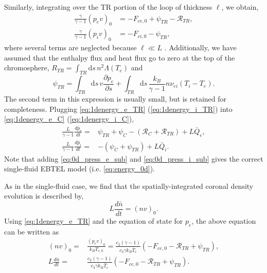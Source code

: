 Similarly, integrating over the TR portion of the loop of thickness $\ell$, we obtain,
\begin{align}
    \frac{\gamma}{\gamma - 1}(p_ev)_0 &= - F_{ce,0} + \psi_{TR} - \mathcal{R}_{TR}, \label{eq:1denergy_e_TR} \\[0.5em]
    \frac{\gamma}{\gamma - 1}(p_iv)_0 &=  - F_{ci,0} - \psi_{TR}, \label{eq:1denergy_i_TR}
\end{align}
where several terms are neglected because $\ell\ll L$ \citep{klimchuk_highly_2008}. Additionally, we have assumed that the enthalpy flux and heat flux go to zero at the top of the chromosphere, $R_{TR}=\int_{TR}\mathrm{d}s\,n^2\Lambda(T_e)$ and
\begin{equation}
    \psi_{TR}=\int_{TR}\mathrm{d}s\,v\frac{\partial p_e}{\partial s} + \int_{TR}\mathrm{d}s\,\frac{k_B}{\gamma - 1}n\nu_{ei}(T_i - T_e).
\end{equation}
The second term in this expression is usually small, but is retained for completeness.  Plugging \autoref{eq:1denergy_e_TR} (\autoref{eq:1denergy_i_TR}) into \autoref{eq:1denergy_e_C} (\autoref{eq:1denergy_i_C}),
\begin{align}
    \frac{L}{\gamma - 1}\frac{d\bar{p}_e}{dt} =& \psi_{TR} + \psi_C -(\mathcal{R}_C + \mathcal{R}_{TR}) + L\bar{Q}_{e},\label{eq:0d_press_e_sub} \\[0.5em]
    \frac{L}{\gamma - 1}\frac{d\bar{p}_i}{dt} =& -(\psi_{C} + \psi_{TR}) +  L\bar{Q}_{i}.\label{eq:0d_press_i_sub}
\end{align}
Note that adding \autoref{eq:0d_press_e_sub} and \autoref{eq:0d_press_i_sub} gives the correct single-fluid EBTEL model (i.e. \autoref{eq:energy_0d}).

As in the single-fluid case, we find that the spatially-integrated coronal density evolution is described by,
\begin{equation}
    L\frac{d\bar{n}}{dt} = (nv)_0.
\end{equation}
Using \autoref{eq:1denergy_e_TR} and the equation of state for $p_e$, the above equation can be written as
\begin{align}
    (nv)_0 =& \frac{(p_ev)_0}{k_BT_{e,0}} = \frac{c_2(\gamma - 1)}{c_3\gamma k_B\bar{T}_e}(-F_{ce,0} - \mathcal{R}_{TR} + \psi_{TR}),\\
    L\frac{d\bar{n}}{dt} =& \frac{c_2(\gamma - 1)}{c_3\gamma k_B\bar{T}_e}(-F_{ce,0} - \mathcal{R}_{TR} + \psi_{TR}).\label{eq:0d_mass_sub}
\end{align}

